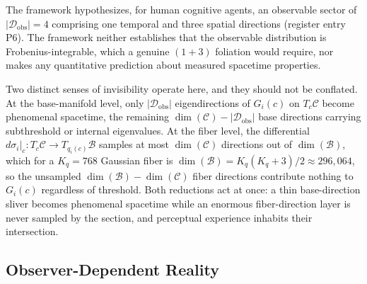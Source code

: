 \documentclass[11pt]{article}
\begin{document}
The framework hypothesizes, for human cognitive agents, an observable sector of $|\mathcal{D}_{\text{obs}}| = 4$ comprising one temporal and three spatial directions (register entry P6). The framework neither establishes that the observable distribution is Frobenius-integrable, which a genuine $(1+3)$ foliation would require, nor makes any quantitative prediction about measured spacetime properties.

Two distinct senses of invisibility operate here, and they should not be conflated. At the base-manifold level, only $|\mathcal{D}_{\text{obs}}|$ eigendirections of $G_i(c)$ on $T_c\mathcal{C}$ become phenomenal spacetime, the remaining $\dim(\mathcal{C}) - |\mathcal{D}_{\text{obs}}|$ base directions carrying subthreshold or internal eigenvalues. At the fiber level, the differential $d\sigma_i|_c: T_c\mathcal{C} \to T_{q_i(c)}\mathcal{B}$ samples at most $\dim(\mathcal{C})$ directions out of $\dim(\mathcal{B})$, which for a $K_q = 768$ Gaussian fiber is $\dim(\mathcal{B}) = K_q(K_q+3)/2 \approx 296{,}064$, so the unsampled $\dim(\mathcal{B}) - \dim(\mathcal{C})$ fiber directions contribute nothing to $G_i(c)$ regardless of threshold. Both reductions act at once: a thin base-direction sliver becomes phenomenal spacetime while an enormous fiber-direction layer is never sampled by the section, and perceptual experience inhabits their intersection.

\subsection{Observer-Dependent Reality}
\label{sec:observer}
\end{document}
